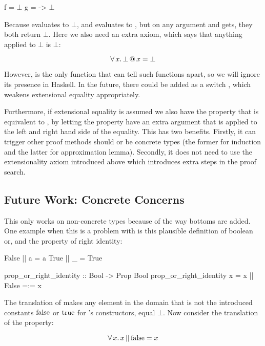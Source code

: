 \begin{code}[mathescape]
f = $\bot$
g = \x -> $\bot$
\end{code}

Because  evaluates to $\bot$, and  evaluates
to \hs{()}, but on any argument  and  gets, they both
return $\bot$. Here we also need an extra axiom, which says that
anything applied to $\bot$ is $\bot$:

\begin{equation*}
\forall \, x . \, \bot \, @ \, x = \bot
\end{equation*}

However,  is the only function that can tell such functions
apart, so we will ignore its presence in Haskell.  In the future,
there could be added as a switch , which weakens
extensional equality appropriately.

Furthermore, if extensional equality is assumed we also have the
property that  is equivalent to , by
letting the property have an extra argument that is applied to the
left and right hand side of the equality. This has two
benefits. Firstly, it can trigger other proof methods should  or
 be concrete types (the former for induction and the latter for
approximation lemma). Secondly, it does not need to use the
extensionality axiom introduced above which introduces extra steps in
the proof search.

\subsection{Future Work: Concrete Concerns}
\label{sec:concreteconcerns}

This only works on non-concrete types because of the way bottoms are
added. One example when this is a problem with is this plausible
definition of boolean or, and the property of right identity:

\begin{code}
False || a = a
True  || _ = True

prop_or_right_identity :: Bool -> Prop Bool
prop_or_right_identity x = x || False =:= x
\end{code}

The translation of \hs{||} makes any element in the domain that is not
the introduced constants $\mathrm{false}$ or $\mathrm{true}$ for 's
constructors, equal $\bot$. Now consider the translation of the
property:

\begin{equation*}
\forall \, x . \, x \, \mathrm{||} \, \mathrm{false} = x
\end{equation*}

